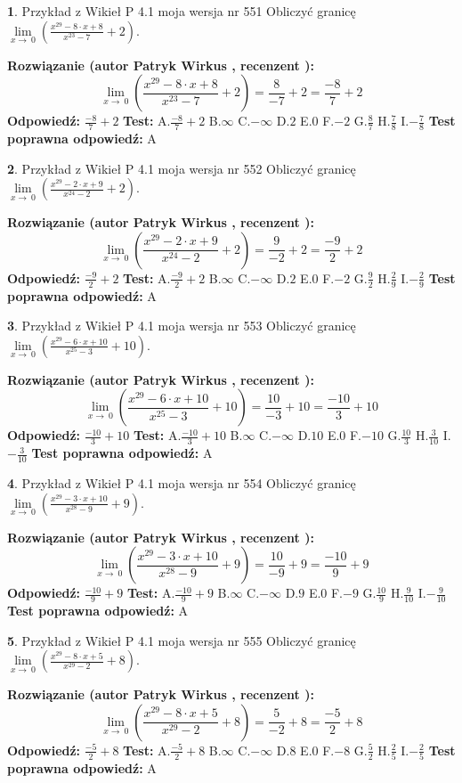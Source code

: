 \documentclass[12pt, a4paper]{article}
\theoremstyle{definition} %
\newtheorem{zad}{}
\newcommand{\zadStart}[1]{\begin{zad}#1\newline}
\newcommand{\zadStop}{\end{zad}}
\newcommand{\rozwStart}[2]{\noindent \textbf{Rozwiązanie (autor #1 , recenzent #2): }\newline}
\newcommand{\rozwStop}{\newline}
\newcommand{\odpStart}{\noindent \textbf{Odpowiedź:}\newline}
\newcommand{\odpStop}{\newline}
\newcommand{\testStart}{\noindent \textbf{Test:}\newline}
\newcommand{\testStop}{\newline}
\newcommand{\kluczStart}{\noindent \textbf{Test poprawna odpowiedź:}\newline}
\newcommand{\kluczStop}{\newline}
\begin{document}
\zadStart{Przykład z Wikieł P 4.1 moja wersja nr 551}
Obliczyć granicę $\lim\limits_{x\to\ 0}(\frac{x^{29}-8 \cdot x +8}{x^{23}-7}+2)$.
\zadStop
\rozwStart{Patryk Wirkus}{}
$$\lim\limits_{x\to\ 0}(\frac{x^{29}-8 \cdot x +8}{x^{23}-7}+2)=\frac{8}{-7}+2=\frac{-8}{7}+2$$
\rozwStop
\odpStart
$\frac{-8}{7}+2$
\odpStop
\testStart
A.$\frac{-8}{7}+2$
B.$\infty$
C.$-\infty$
D.$2$
E.$0$
F.$-2$
G.$\frac{8}{7}$
H.$\frac{7}{8}$
I.$-\frac{7}{8}$
\testStop
\kluczStart
A
\kluczStop



\zadStart{Przykład z Wikieł P 4.1 moja wersja nr 552}
Obliczyć granicę $\lim\limits_{x\to\ 0}(\frac{x^{29}-2 \cdot x +9}{x^{24}-2}+2)$.
\zadStop
\rozwStart{Patryk Wirkus}{}
$$\lim\limits_{x\to\ 0}(\frac{x^{29}-2 \cdot x +9}{x^{24}-2}+2)=\frac{9}{-2}+2=\frac{-9}{2}+2$$
\rozwStop
\odpStart
$\frac{-9}{2}+2$
\odpStop
\testStart
A.$\frac{-9}{2}+2$
B.$\infty$
C.$-\infty$
D.$2$
E.$0$
F.$-2$
G.$\frac{9}{2}$
H.$\frac{2}{9}$
I.$-\frac{2}{9}$
\testStop
\kluczStart
A
\kluczStop



\zadStart{Przykład z Wikieł P 4.1 moja wersja nr 553}
Obliczyć granicę $\lim\limits_{x\to\ 0}(\frac{x^{29}-6 \cdot x +10}{x^{25}-3}+10)$.
\zadStop
\rozwStart{Patryk Wirkus}{}
$$\lim\limits_{x\to\ 0}(\frac{x^{29}-6 \cdot x +10}{x^{25}-3}+10)=\frac{10}{-3}+10=\frac{-10}{3}+10$$
\rozwStop
\odpStart
$\frac{-10}{3}+10$
\odpStop
\testStart
A.$\frac{-10}{3}+10$
B.$\infty$
C.$-\infty$
D.$10$
E.$0$
F.$-10$
G.$\frac{10}{3}$
H.$\frac{3}{10}$
I.$-\frac{3}{10}$
\testStop
\kluczStart
A
\kluczStop



\zadStart{Przykład z Wikieł P 4.1 moja wersja nr 554}
Obliczyć granicę $\lim\limits_{x\to\ 0}(\frac{x^{29}-3 \cdot x +10}{x^{28}-9}+9)$.
\zadStop
\rozwStart{Patryk Wirkus}{}
$$\lim\limits_{x\to\ 0}(\frac{x^{29}-3 \cdot x +10}{x^{28}-9}+9)=\frac{10}{-9}+9=\frac{-10}{9}+9$$
\rozwStop
\odpStart
$\frac{-10}{9}+9$
\odpStop
\testStart
A.$\frac{-10}{9}+9$
B.$\infty$
C.$-\infty$
D.$9$
E.$0$
F.$-9$
G.$\frac{10}{9}$
H.$\frac{9}{10}$
I.$-\frac{9}{10}$
\testStop
\kluczStart
A
\kluczStop



\zadStart{Przykład z Wikieł P 4.1 moja wersja nr 555}
Obliczyć granicę $\lim\limits_{x\to\ 0}(\frac{x^{29}-8 \cdot x +5}{x^{29}-2}+8)$.
\zadStop
\rozwStart{Patryk Wirkus}{}
$$\lim\limits_{x\to\ 0}(\frac{x^{29}-8 \cdot x +5}{x^{29}-2}+8)=\frac{5}{-2}+8=\frac{-5}{2}+8$$
\rozwStop
\odpStart
$\frac{-5}{2}+8$
\odpStop
\testStart
A.$\frac{-5}{2}+8$
B.$\infty$
C.$-\infty$
D.$8$
E.$0$
F.$-8$
G.$\frac{5}{2}$
H.$\frac{2}{5}$
I.$-\frac{2}{5}$
\testStop
\kluczStart
A
\kluczStop
\end{document}
